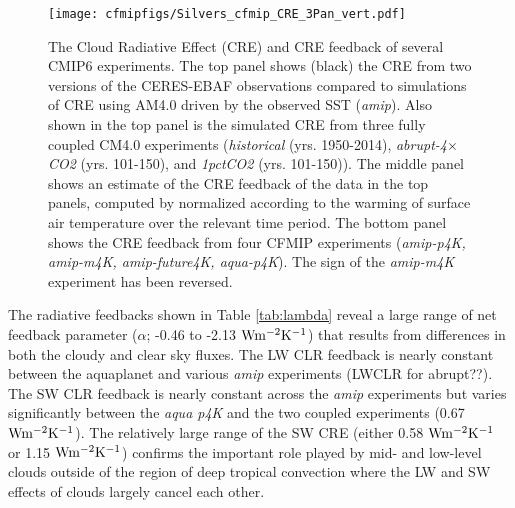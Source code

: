 \documentclass[draft]{agujournal2019}
\begin{document}
\begin{figure}
  \centering
  \texttt{[image: cfmipfigs/Silvers\_cfmip\_CRE\_3Pan\_vert.pdf]}
  \caption{The Cloud Radiative Effect (CRE) and CRE feedback of several CMIP6 experiments.  The top panel 
  shows (black) the CRE from two versions of the CERES-EBAF observations compared to 
  simulations of CRE using AM4.0 driven by the observed SST (\textit{amip}).  Also 
  shown in the top panel is the simulated CRE from three fully coupled CM4.0 experiments (\textit{historical} (yrs. 1950-2014),
  \textit{abrupt-4$\times$CO2} (yrs. 101-150), and \textit{1pctCO2} (yrs. 101-150)).  The middle panel shows an estimate of the 
  CRE feedback of the data in the top panels, computed by normalized according to the warming of surface air temperature over 
  the relevant time period.  The bottom panel shows the CRE feedback from four 
  CFMIP experiments (\textit{amip-p4K, amip-m4K, amip-future4K, aqua-p4K}).  The sign of the \textit{amip-m4K} experiment has 
  been reversed.}
  \label{fig:CRE_feedback}
\end{figure}    


%
%

The radiative feedbacks shown in Table \ref{tab:lambda} reveal a large range of net feedback parameter 
($\alpha$; -0.46 to -2.13 $\rm{W m^{-2}K^{-1}}$) that results from differences in 
both the cloudy and clear sky fluxes.   The LW CLR feedback is nearly constant between the 
aquaplanet and various \textit{amip} experiments (LWCLR for abrupt??).   The SW CLR 
feedback is nearly constant across the \textit{amip} experiments but varies significantly
between the \textit{aqua p4K} and the two coupled experiments (0.67 $\rm{W m^{-2}K^{-1}}$).
The relatively large range of the SW CRE (either 0.58 $\rm{W m^{-2}K^{-1}}$ or 1.15 $\rm{W m^{-2}K^{-1}}$)
confirms the important role played by mid- and low-level clouds outside of the region of 
deep tropical convection where the LW and SW effects of clouds largely cancel each other.  
\end{document}
